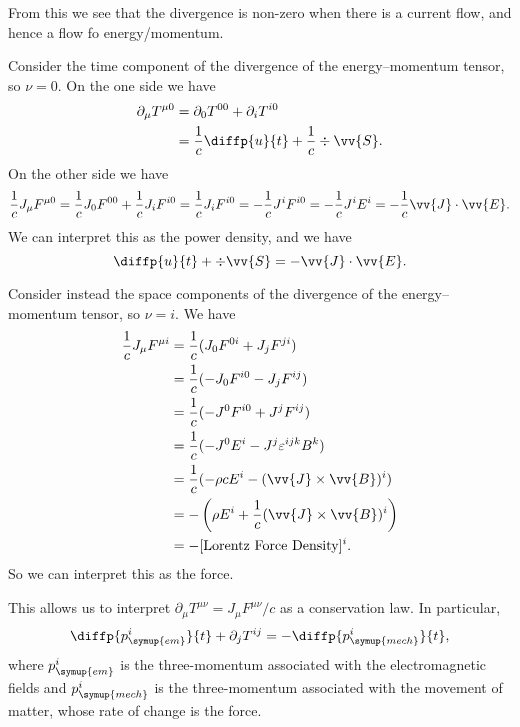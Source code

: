 From this we see that the divergence is non-zero when there is a current flow, and hence a flow fo energy/momentum.

Consider the time component of the divergence of the energy--momentum tensor, so \(\nu = 0\).
On the one side we have
\begin{align}
    \partial_\mu T^{\mu0} &= \partial_0T^{00} + \partial_iT^{i0}\\
    &= \frac{1}{c}\diffp{u}{t} + \frac{1}{c}\div\vv{S}.
\end{align}
On the other side we have
\begin{align}
    \frac{1}{c}J_\mu F^{\mu0} = \frac{1}{c}J_0F^{00} + \frac{1}{c}J_iF^{i0} = \frac{1}{c}J_iF^{i0} = -\frac{1}{c}J^iF^{i0} = -\frac{1}{c}J^iE^i = -\frac{1}{c}\vv{J}\cdot\vv{E}.
\end{align}
We can interpret this as the power density, and we have
\begin{equation}
    \diffp{u}{t} + \div\vv{S} = -\vv{J}\cdot\vv{E}.
\end{equation}

Consider instead the space components of the divergence of the energy--momentum tensor, so \(\nu = i\).
We have
\begin{align}
    \frac{1}{c}J_\mu F^{\mu i} &= \frac{1}{c}(J_0F^{0i} + J_jF^{ji})\\
    &= \frac{1}{c}(-J_0F^{i0} - J_jF^{ij})\\
    &= \frac{1}{c}(-J^0F^{i0} + J^jF^{ij})\\
    &= \frac{1}{c}(-J^0E^i - J^j\varepsilon^{ijk}B^k)\\
    &= \frac{1}{c}(-\rho cE^i - (\vv{J}\times\vv{B})^i)\\
    &= -\left( \rho E^i + \frac{1}{c}(\vv{J} \times \vv{B})^i \right)\\
    &= -[\text{Lorentz Force Density}]^i.
\end{align}
So we can interpret this as the force.

This allows us to interpret \(\partial_\mu T^{\mu\nu} = J_\mu F^{\mu\nu}/c\) as a conservation law.
In particular,
\begin{equation}
    \diffp{p_{\symup{em}}^i}{t} + \partial_j T^{ij} = -\diffp{p_{\symup{mech}}^i}{t},
\end{equation}
where \(p_{\symup{em}}^i\) is the three-momentum associated with the electromagnetic fields and \(p_{\symup{mech}}^i\) is the three-momentum associated with the movement of matter, whose rate of change is the force.

